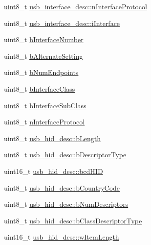 \begin{DoxyCompactItemize}
\item 
uint8\-\_\-t \hyperlink{group___p_i_o_s___u_s_b___d_e_f_s_ga1e2e09e7b88f6a84a53129afefdc75d3}{usb\-\_\-interface\-\_\-desc\-::n\-Interface\-Protocol}
\item 
uint8\-\_\-t \hyperlink{group___p_i_o_s___u_s_b___d_e_f_s_ga93404aa8e9b859c2759b7a02b6533222}{usb\-\_\-interface\-\_\-desc\-::i\-Interface}
\item 
uint8\-\_\-t \hyperlink{group___p_i_o_s___u_s_b___d_e_f_s_ga3d66d88c5e928462aef62633449f1eb0}{b\-Interface\-Number}
\item 
uint8\-\_\-t \hyperlink{group___p_i_o_s___u_s_b___d_e_f_s_ga4cdd7aab185365e51a1e722f43073b8c}{b\-Alternate\-Setting}
\item 
uint8\-\_\-t \hyperlink{group___p_i_o_s___u_s_b___d_e_f_s_gacec2e7d68271baace354a0539f3d7e3d}{b\-Num\-Endpoints}
\item 
uint8\-\_\-t \hyperlink{group___p_i_o_s___u_s_b___d_e_f_s_gae899427763e325f03241afc69a6e1ea0}{b\-Interface\-Class}
\item 
uint8\-\_\-t \hyperlink{group___p_i_o_s___u_s_b___d_e_f_s_ga3b3919d1203cd42550d77287f7585595}{b\-Interface\-Sub\-Class}
\item 
uint8\-\_\-t \hyperlink{group___p_i_o_s___u_s_b___d_e_f_s_ga056d861642d341ddff9b5b6bb5b24ea9}{n\-Interface\-Protocol}
\item 
uint8\-\_\-t \hyperlink{group___p_i_o_s___u_s_b___d_e_f_s_ga738612f01d93af966dfd2e9fbf29e409}{usb\-\_\-hid\-\_\-desc\-::b\-Length}
\item 
uint8\-\_\-t \hyperlink{group___p_i_o_s___u_s_b___d_e_f_s_ga6fd7eaaf97d6f887fb38056456f79038}{usb\-\_\-hid\-\_\-desc\-::b\-Descriptor\-Type}
\item 
uint16\-\_\-t \hyperlink{group___p_i_o_s___u_s_b___d_e_f_s_gab7e8d21f875c12e9ed7715a78fe5bb9e}{usb\-\_\-hid\-\_\-desc\-::bcd\-H\-I\-D}
\item 
uint8\-\_\-t \hyperlink{group___p_i_o_s___u_s_b___d_e_f_s_gadbef4d9e2e13fd696fcf8339ee1a27b3}{usb\-\_\-hid\-\_\-desc\-::b\-Country\-Code}
\item 
uint8\-\_\-t \hyperlink{group___p_i_o_s___u_s_b___d_e_f_s_ga5bce1598e0b04efe977788e2027fde3a}{usb\-\_\-hid\-\_\-desc\-::b\-Num\-Descriptors}
\item 
uint8\-\_\-t \hyperlink{group___p_i_o_s___u_s_b___d_e_f_s_ga25fe14740813f95e5163aeb719b36d35}{usb\-\_\-hid\-\_\-desc\-::b\-Class\-Descriptor\-Type}
\item 
uint16\-\_\-t \hyperlink{group___p_i_o_s___u_s_b___d_e_f_s_ga86359b23d6a148a291cb15cab529444b}{usb\-\_\-hid\-\_\-desc\-::w\-Item\-Length}

\end{DoxyCompactItemize}
